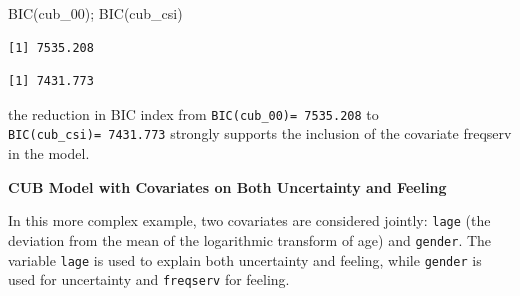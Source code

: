 \documentclass[
  letterpaper,
  DIV=11,
  numbers=noendperiod]{scrartcl}
\newenvironment{Shaded}{\begin{snugshade}}{\end{snugshade}}
\newcommand{\AttributeTok}[1]{\textcolor[rgb]{0.40,0.45,0.13}{#1}}
\newcommand{\CommentTok}[1]{\textcolor[rgb]{0.37,0.37,0.37}{#1}}
\newcommand{\ConstantTok}[1]{\textcolor[rgb]{0.56,0.35,0.01}{#1}}
\newcommand{\DecValTok}[1]{\textcolor[rgb]{0.68,0.00,0.00}{#1}}
\newcommand{\FunctionTok}[1]{\textcolor[rgb]{0.28,0.35,0.67}{#1}}
\newcommand{\NormalTok}[1]{\textcolor[rgb]{0.00,0.23,0.31}{#1}}
\newcommand{\OtherTok}[1]{\textcolor[rgb]{0.00,0.23,0.31}{#1}}
\newcommand{\SpecialCharTok}[1]{\textcolor[rgb]{0.37,0.37,0.37}{#1}}
\newcommand{\StringTok}[1]{\textcolor[rgb]{0.13,0.47,0.30}{#1}}
\begin{document}
\begin{Shaded}
\begin{Highlighting}[]
\FunctionTok{BIC}\NormalTok{(cub\_00); }\FunctionTok{BIC}\NormalTok{(cub\_csi)}
\end{Highlighting}
\end{Shaded}

\begin{verbatim}
[1] 7535.208
\end{verbatim}

\begin{verbatim}
[1] 7431.773
\end{verbatim}

the reduction in BIC index from \texttt{BIC(cub\_00)=\ 7535.208} to
\texttt{BIC(cub\_csi)=\ 7431.773} strongly supports the inclusion of the
covariate freqserv in the model.

\textbf{CUB Model with Covariates on Both Uncertainty and Feeling}

In this more complex example, two covariates are considered jointly:
\texttt{lage} (the deviation from the mean of the logarithmic transform
of age) and \texttt{gender}. The variable \texttt{lage} is used to
explain both uncertainty and feeling, while \texttt{gender} is used for
uncertainty and \texttt{freqserv} for feeling.

\begin{Shaded}
\end{Shaded}
\end{document}
